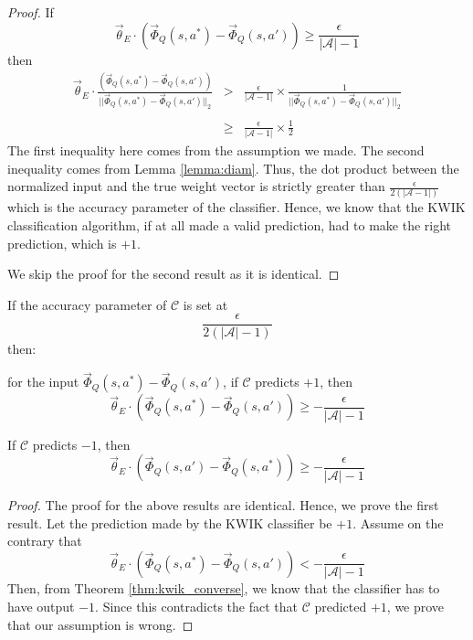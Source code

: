  
\begin{proof}
If 
\begin{equation}
\vec{\theta}_E \cdot (\vec{\Phi}_Q(s,a^*) - \vec{\Phi}_Q(s,a')) \geq  \frac{\epsilon}{|\mathcal{A}|-1}
\end{equation}
then
\[
\begin{array}{rcl}
{\vec{\theta}_E \cdot \displaystyle \frac{(\vec{\Phi}_Q(s,a^*) - \vec{\Phi}_Q(s,a'))}{||\vec{\Phi}_Q(s,a^*) - \vec{\Phi}_Q(s,a')||_2 } } & 
>& \displaystyle \frac{\epsilon}{|\mathcal{A}-1|} \times \frac{1}{||\vec{\Phi}_Q(s,a^*) - \vec{\Phi}_Q(s,a')||_2} \\
&&\\
&\geq& \displaystyle\frac{\epsilon}{|\mathcal{A}-1|}  \times \frac{1}{2}
\end{array}
\]
The first inequality here comes from the assumption we made. The second inequality comes from Lemma \ref{lemma:diam}. Thus, the dot product between the normalized input and the true weight vector is strictly greater than $\frac{\epsilon}{2(|\mathcal{A}-1|)}$ which is the accuracy parameter of the classifier. Hence, we know that the KWIK classification algorithm, if at all made a valid prediction, had to make the right prediction, which is $+1$.

We skip the proof for the second result as it is identical.
\end{proof} 
 
 
\begin{thm}
\label{thm:kwik_condition}
If the accuracy parameter of $\mathcal{C}$ is set at
\[
\frac{\epsilon}{2(|\mathcal{A}|-1)}
\]
then:

 for the input $\vec{\Phi}_Q(s,a^*) - \vec{\Phi}_Q(s,a')$, if $\mathcal{C}$ predicts $+1$, then 
\begin{equation}
\vec{\theta}_E \cdot (\vec{\Phi}_Q(s,a^*) - \vec{\Phi}_Q(s,a')) \geq - \frac{\epsilon}{|\mathcal{A}|-1}
\end{equation}

If $\mathcal{C}$ predicts $-1$, then
\begin{equation}
\vec{\theta}_E \cdot (\vec{\Phi}_Q(s,a') - \vec{\Phi}_Q(s,a^*)) \geq - \frac{\epsilon}{|\mathcal{A}|-1}
\end{equation}

\end{thm}

\begin{proof}
The proof for the above results are identical. Hence, we prove the first result. Let the prediction made by the KWIK classifier be $+1$. Assume on the contrary that 
\[
\vec{\theta}_E \cdot (\vec{\Phi}_Q(s,a^*) - \vec{\Phi}_Q(s,a')) < - \frac{\epsilon}{|\mathcal{A}|-1}
\]
Then, from Theorem \ref{thm:kwik_converse}, we know that the classifier has to have output $-1$.  Since this contradicts the fact that $\mathcal{C}$ predicted $+1$, we prove that our assumption is wrong. 
\end{proof}

